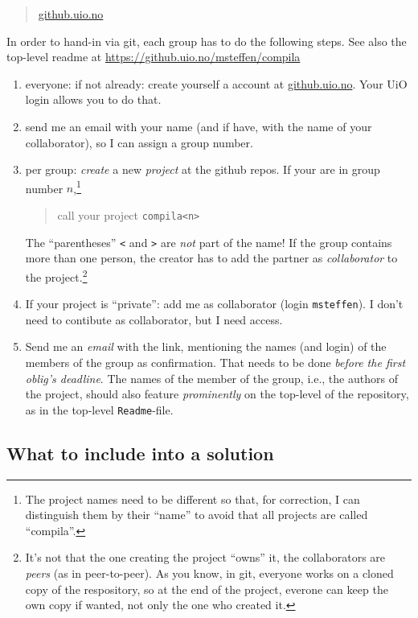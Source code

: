\documentclass[10pt,freeform]{handout}[2014/08/13]
\begin{document}
\begin{quote}
  \url{github.uio.no}
\end{quote}


In order to hand-in via git, each group has to do the following steps. See
also the top-level readme at \url{https://github.uio.no/msteffen/compila}

\begin{enumerate}
\item everyone: if not already: create yourself a account at
  \url{github.uio.no}. Your UiO login allows you to do that.
\item send me an email with your name (and if have, with the name of your
  collaborator), so I can assign a group number.
\item per group: \emph{create} a new \emph{project} at the github repos.
  If your are in group number $n$,\footnote{The project names need to be
    different so that, for correction, I can distinguish them by their
    ``name'' to avoid that all projects are called ``compila''.}
  \begin{quote}
    call your project \texttt{compila<n>}
  \end{quote}
  The ``parentheses'' \texttt{<} and \texttt{>} are \emph{not} part of the
  name! If the group contains more than one person, the creator has to add
  the partner as \emph{collaborator} to the project.\footnote{It's not that
    the one creating the project ``owns'' it, the collaborators are
    \emph{peers} (as in peer-to-peer). As you know, in git, everyone works
    on a cloned copy of the respository, so at the end of the project,
    everone can keep the own copy if wanted, not only the one who created
    it.}
\item If your project is ``private'': add me as collaborator (login
  \texttt{msteffen}). I don't need to contibute as collaborator, but I need
  access.
\item Send me an \emph{email} with the link, mentioning the names (and
  login) of the members of the group as confirmation. That needs to be done
  \emph{before the first oblig's deadline}. The names of the member of the
  group, i.e., the authors of the project, should also feature
  \emph{prominently} on the top-level of the repository, as in the
  top-level \texttt{Readme}-file.
\end{enumerate}


\subsection{What to include into a solution}
\label{sec:what-include-into}
\end{document}
